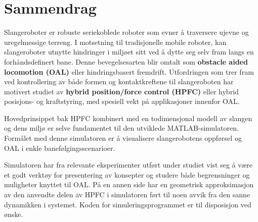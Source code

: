 \chapter{Sammendrag}




Slangeroboter er robuste seriekoblede roboter som evner å traversere ujevne og uregelmessige terreng. I motsetning til tradisjonelle mobile roboter, kan slangeroboter utnytte hindringer i miljøet sitt ved å dytte seg selv fram langs en forhåndsdefinert bane. Denne bevegelsesarten blir omtalt som \textbf{obstacle aided locomotion (OAL)} eller hindringsbasert fremdrift. Utfordringen som trer fram ved kontrollering av både formen og kontaktkreftene til slangeroboten har motivert studiet av  \textbf{hybrid position/force control (HPFC)} eller hybrid posisjons- og kraftstyring, med spesiell vekt på applikasjoner innenfor OAL.

Hovedprinsippet bak HPFC kombinert med en todimensjonal modell av slangen og dens miljø er selve fundamentet til den utviklede MATLAB-simulatoren. Formålet med denne simulatoren er å visualisere slangerobotens oppførsel og OAL i enkle banefølgingsscenarioer.

Simulatoren har fra relevante eksperimenter utført under studiet vist seg å være et godt verktøy for presentering av konsepter og studere både begrensninger og muligheter knyttet til OAL. På en annen side har en geometrisk approksimasjon av den anvendte delen av HPFC i simulatoren ført til noen avvik fra den sanne dynamikken i systemet. Koden for simuleringsprogrammet er til disposisjon ved ønske.

\makeatletter
{}


\makeatother








